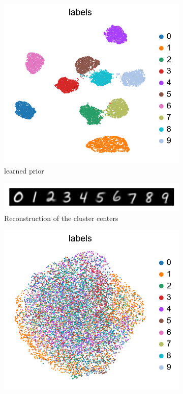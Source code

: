 \documentclass[11pt, a4paper]{report}
\theoremstyle{plain}
\theoremstyle{definition}
\theoremstyle{remark}
\begin{document}
\begin{figure}[!h]
\begin{framed}
\centering
\begin{subfigure}[b]{0.33\textwidth}
\includegraphics[width=\textwidth]{images/cvae2lp.umap.mnist.png}
\caption{learned prior}
\end{subfigure}
\begin{subfigure}[t]{0.33\textwidth}
\includegraphics[width=\textwidth]{images/cvae2lp.clusterheads.mnist.png}
\caption{Reconstruction of the cluster centers}
\end{subfigure}
\begin{subfigure}[b]{0.33\textwidth}
\includegraphics[width=\textwidth]{images/cvae1nolp.umap.mnist.png}

\end{subfigure}
\end{framed}
\end{figure}
\end{document}
